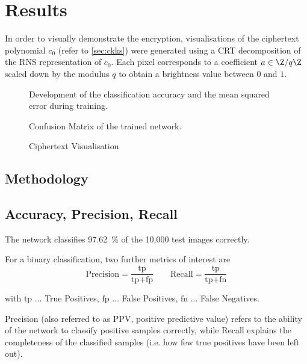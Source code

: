 \chapter{Results}
\label{chap:results}
In order to visually demonstrate the encryption, visualisations of the ciphertext polynomial $c_0$ (refer to \autoref{sec:ckks}) were generated using a CRT decomposition of the RNS representation of $c_0$.
Each pixel corresponds to a coefficient $a \in \Z / q\Z$ scaled down by the modulus $q$ to obtain a brightness value between $0$ and $1$.

\begin{figure}[H]
  \centering
  \pgfplotsset{/pgfplots/group/.cd,vertical sep=1.6cm}
  \caption{Development of the classification accuracy and the mean squared error during training.}
\end{figure}

\begin{figure}[H]
  \centering
  \caption{Confusion Matrix of the trained network.}
\end{figure}

\begin{figure}[H]
  \centering
  \caption{Ciphertext Visualisation}
\end{figure}

\section{Methodology}

\section{Accuracy, Precision, Recall}
The network classifies \SI{97.62}{\percent} of the 10,000 test images correctly.

For a binary classification, two further metrics of interest are
$$\text{Precision} = \frac{\text{tp}}{\text{tp} + \text{fp}} \quad\quad
  \text{Recall} = \frac{\text{tp}}{\text{tp} + \text{fn}}$$

with
$\text{tp}$ ... True Positives,
$\text{fp}$ ... False Positives,
$\text{fn}$ ... False Negatives.

Precision (also referred to as PPV, positive predictive value) refers to the ability of the network to classify positive samples correctly, while Recall explains the completeness of the classified samples (i.e. how few true positives have been left out).

